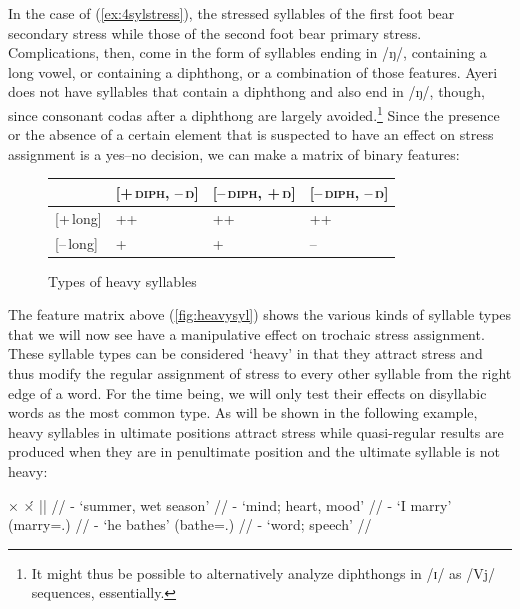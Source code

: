 In the case of (\ref{ex:4sylstress}), the stressed syllables of the first foot 
bear secondary stress while those of the second foot bear primary stress. 
Complications, then, come in the form of syllables ending in /ŋ/, containing a 
long vowel, or containing a diphthong, or a combination of those features.
Ayeri does not have syllables that contain a diphthong and 
also end in /ŋ/, though, since consonant codas after a diphthong are largely 
avoided.\footnote{It might thus be possible to alternatively analyze diphthongs 
in /ɪ/ as /Vj/ sequences, essentially.} Since the presence or the absence of a 
certain element that is suspected to have an effect on stress assignment is a 
yes–no decision, we can make a matrix of binary features:

\begin{figure}[h]\centering
\caption{Types of heavy syllables}
\scshape
\begin{tabu} to .75\linewidth {H X[c] X[c] X[c]}
\tableheaderfont\toprule

	& \textsc{[+\,diph, –\,ŋ]}
	& \textsc{[–\,diph, +\,ŋ]}
	& \textsc{[–\,diph, –\,ŋ]}
	\\
	
\toprule

[+\,long]
	& ++
	& ++
	& ++
	\\

[–\,long]
	& +
	& +
	& –
	\\

\bottomrule
\end{tabu}
\label{fig:heavysyl}
\end{figure}

The feature matrix above (\autoref{fig:heavysyl}) shows the various kinds of 
syllable types that we will now see have a manipulative effect on trochaic 
stress assignment. These syllable types can be considered `heavy' in that they
attract stress and thus modify the regular assignment of stress to every other 
syllable from the right edge of a word. For the time being, we will only test 
their effects on disyllabic words as the most common type. As will be shown in 
the following example, heavy syllables in ultimate positions attract stress 
while quasi-regular results are produced when they are in penultimate position 
and the ultimate syllable is not heavy:

\pex[everygla=\upshape]\label{ex:firstlh}
\a\label{ex:firstlight}\begingl
	\gla ×		{}	×́		||	{} //
	\glb {}	-		{}
		{`summer, wet season'} //
	\glb {}	-		{}	{`mind; heart, mood'} //
	\glb {}	-		{}
		{`I marry' (marry=\Fsg{}.\Top{})} //
	\glb {}	-		{}
		{`he bathes' (bathe=\TsgM{}.\Aarg{})} //
	\glb {}	-		{}	{`word; speech'} //
\endgl

